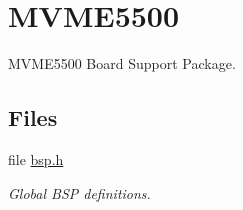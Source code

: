 \hypertarget{group__RTEMSBSPsPowerPCMVME5500}{}\section{M\+V\+M\+E5500}
\label{group__RTEMSBSPsPowerPCMVME5500}


M\+V\+M\+E5500 Board Support Package.  


\subsection*{Files}
\begin{DoxyCompactItemize}
\item 
file \mbox{\hyperlink{bsps_2powerpc_2mvme5500_2include_2bsp_8h}{bsp.\+h}}
\begin{DoxyCompactList}\small\item\em Global B\+SP definitions. \end{DoxyCompactList}\end{DoxyCompactItemize}

